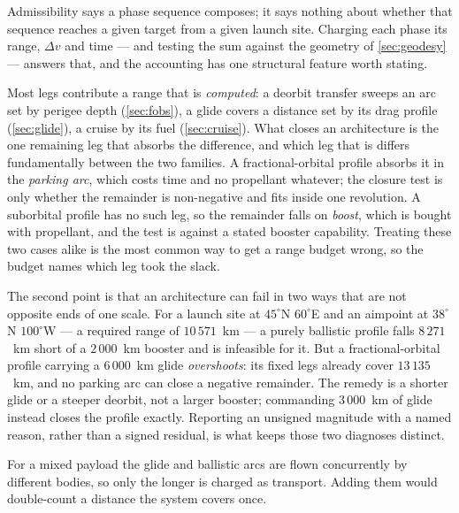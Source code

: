 \documentclass[11pt,a4paper]{article}
\theoremstyle{definition}
\numberwithin{equation}{section}
\begin{document}
Admissibility says a phase sequence composes; it says nothing about whether that sequence reaches a given target from a given launch site. Charging each phase its range, $\Delta v$ and time --- and testing the sum against the geometry of \cref{sec:geodesy} --- answers that, and the accounting has one structural feature worth stating.

Most legs contribute a range that is \emph{computed}: a deorbit transfer sweeps an arc set by perigee depth (\cref{sec:fobs}), a glide covers a distance set by its drag profile (\cref{sec:glide}), a cruise by its fuel (\cref{sec:cruise}). What closes an architecture is the one remaining leg that absorbs the difference, and which leg that is differs fundamentally between the two families. A fractional-orbital profile absorbs it in the \emph{parking arc}, which costs time and no propellant whatever; the closure test is only whether the remainder is non-negative and fits inside one revolution. A suborbital profile has no such leg, so the remainder falls on \emph{boost}, which is bought with propellant, and the test is against a stated booster capability. Treating these two cases alike is the most common way to get a range budget wrong, so the budget names which leg took the slack.

The second point is that an architecture can fail in two ways that are not opposite ends of one scale. For a launch site at $45^\circ$N $60^\circ$E and an aimpoint at $38^\circ$N $100^\circ$W --- a required range of $10\,571$~km --- a purely ballistic profile falls $8\,271$~km short of a $2\,000$~km booster and is infeasible for it. But a fractional-orbital profile carrying a $6\,000$~km glide \emph{overshoots}: its fixed legs already cover $13\,135$~km, and no parking arc can close a negative remainder. The remedy is a shorter glide or a steeper deorbit, not a larger booster; commanding $3\,000$~km of glide instead closes the profile exactly. Reporting an unsigned magnitude with a named reason, rather than a signed residual, is what keeps those two diagnoses distinct.

For a mixed payload the glide and ballistic arcs are flown concurrently by different bodies, so only the longer is charged as transport. Adding them would double-count a distance the system covers once.
\end{document}
